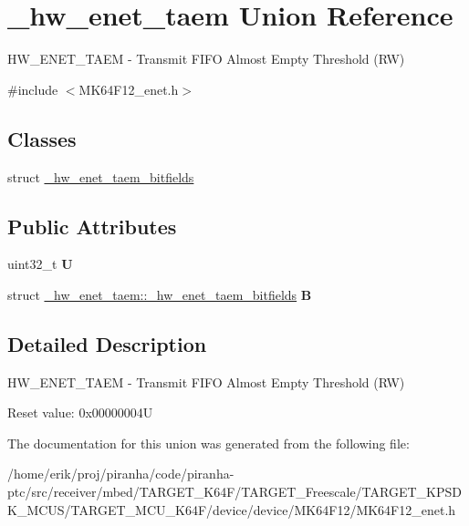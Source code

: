 \hypertarget{union__hw__enet__taem}{}\section{\+\_\+hw\+\_\+enet\+\_\+taem Union Reference}
\label{union__hw__enet__taem}


H\+W\+\_\+\+E\+N\+E\+T\+\_\+\+T\+A\+EM -\/ Transmit F\+I\+FO Almost Empty Threshold (RW)  




{\ttfamily \#include $<$M\+K64\+F12\+\_\+enet.\+h$>$}

\subsection*{Classes}
\begin{DoxyCompactItemize}
\item 
struct \hyperlink{struct__hw__enet__taem_1_1__hw__enet__taem__bitfields}{\+\_\+hw\+\_\+enet\+\_\+taem\+\_\+bitfields}
\end{DoxyCompactItemize}
\subsection*{Public Attributes}
\begin{DoxyCompactItemize}
\item 
uint32\+\_\+t {\bfseries U}\hypertarget{union__hw__enet__taem_ae12e2ee1a08bf4388c0da97a0d30c5f9}{}\label{union__hw__enet__taem_ae12e2ee1a08bf4388c0da97a0d30c5f9}

\item 
struct \hyperlink{struct__hw__enet__taem_1_1__hw__enet__taem__bitfields}{\+\_\+hw\+\_\+enet\+\_\+taem\+::\+\_\+hw\+\_\+enet\+\_\+taem\+\_\+bitfields} {\bfseries B}\hypertarget{union__hw__enet__taem_afcd759c333d92dd2b71702e66238a460}{}\label{union__hw__enet__taem_afcd759c333d92dd2b71702e66238a460}

\end{DoxyCompactItemize}


\subsection{Detailed Description}
H\+W\+\_\+\+E\+N\+E\+T\+\_\+\+T\+A\+EM -\/ Transmit F\+I\+FO Almost Empty Threshold (RW) 

Reset value\+: 0x00000004U 

The documentation for this union was generated from the following file\+:\begin{DoxyCompactItemize}
\item 
/home/erik/proj/piranha/code/piranha-\/ptc/src/receiver/mbed/\+T\+A\+R\+G\+E\+T\+\_\+\+K64\+F/\+T\+A\+R\+G\+E\+T\+\_\+\+Freescale/\+T\+A\+R\+G\+E\+T\+\_\+\+K\+P\+S\+D\+K\+\_\+\+M\+C\+U\+S/\+T\+A\+R\+G\+E\+T\+\_\+\+M\+C\+U\+\_\+\+K64\+F/device/device/\+M\+K64\+F12/M\+K64\+F12\+\_\+enet.\+h\end{DoxyCompactItemize}
